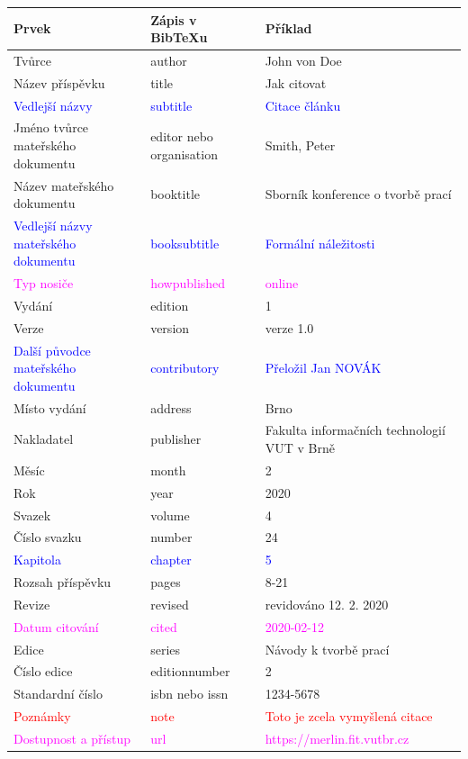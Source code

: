 \begin{tabularx}{\linewidth}{X X X}
    Prvek & Zápis v BibTeXu & Příklad\\\hline
    Tvůrce & author & John von Doe\\
    Název příspěvku & title & Jak citovat\\
    \textcolor{blue}{Vedlejší názvy} & \textcolor{blue}{subtitle} & \textcolor{blue}{Citace článku}\\
    Jméno tvůrce mateřského dokumentu & editor nebo organisation & Smith, Peter\\
    Název mateřského dokumentu & booktitle & Sborník konference o tvorbě prací\\
    \textcolor{blue}{Vedlejší názvy mateřského dokumentu} & \textcolor{blue}{booksubtitle} & \textcolor{blue}{Formální náležitosti}\\
    \textcolor{magenta}{Typ nosiče} & \textcolor{magenta}{howpublished} & \textcolor{magenta}{online}\\
    Vydání & edition & 1\\
    Verze & version & verze 1.0\\
    \textcolor{blue}{Další původce mateřského dokumentu} & \textcolor{blue}{contributory} & \textcolor{blue}{Přeložil Jan NOVÁK}\\
    Místo vydání & address & Brno\\
    Nakladatel & publisher & Fakulta informačních technologií VUT v Brně\\
    Měsíc & month & 2\\
    Rok & year & 2020\\
    Svazek & volume & 4\\
    Číslo svazku & number & 24\\
    \textcolor{blue}{Kapitola} & \textcolor{blue}{chapter} & \textcolor{blue}{5}\\
    Rozsah příspěvku & pages & 8-21\\
    Revize & revised & revidováno 12. 2. 2020\\
    \textcolor{magenta}{Datum citování} & \textcolor{magenta}{cited} & \textcolor{magenta}{2020-02-12}\\
    Edice & series & Návody k tvorbě prací\\
    Číslo edice & editionnumber & 2\\
    Standardní číslo & isbn nebo issn & 1234-5678\\
    \textcolor{red}{Poznámky} & \textcolor{red}{note} & \textcolor{red}{Toto je zcela vymyšlená citace}\\
    \textcolor{magenta}{Dostupnost a přístup} & \textcolor{magenta}{url} & \textcolor{magenta}{https://merlin.fit.vutbr.cz}\\
\end{tabularx}

